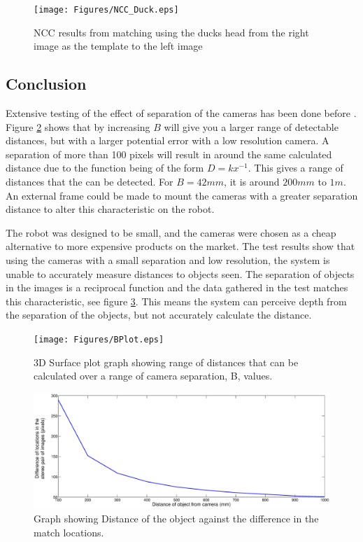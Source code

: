 \begin{figure}
\texttt{[image: Figures/NCC\_Duck.eps]}
\caption{NCC results from matching using the ducks head from the right image as the template to the left image}
\label{fig:duck:ncc}
\end{figure}

\subsection{Conclusion}

Extensive testing of the effect of separation of the cameras has been done before \citep{Mrovlje:Distance_Stereoscopic}. Figure \ref{fig:B:Plot} shows that by increasing $B$ will give you a larger range of detectable distances, but with a larger potential error with a low resolution camera. A separation of more than 100 pixels will result in around the same calculated distance due to the function being of the form $D =kx^{-1}$. This gives a range of distances that the can be detected. For $B=42mm$, it is around $200mm$ to $1m$. An external frame could be made to mount the cameras with a greater separation distance to alter this characteristic on the robot.

The robot was designed to be small, and the cameras were chosen as a cheap alternative to more expensive products on the market. The test results show that using the cameras with a small separation and low resolution, the system is unable to accurately measure distances to objects seen. The separation of objects in the images is a reciprocal function and the data gathered in the test matches this characteristic, see figure \ref{fig:Distance:DeltaX}. This means the system can perceive depth from the separation of the objects, but not accurately calculate the distance. 

\begin{figure}
\texttt{[image: Figures/BPlot.eps]}
\caption{3D Surface plot graph showing range of distances that can be calculated over a range of camera separation, B, values.}
\label{fig:B:Plot}
\end{figure}
\begin{figure}
\includegraphics[width=\textwidth]{Figures/Distance_DeltaX.eps}
\caption{Graph showing Distance of the object against the difference in the match locations.}
\label{fig:Distance:DeltaX}
\end{figure}
